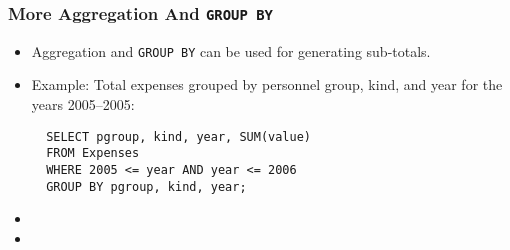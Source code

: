 \documentclass[dvipsnames]{beamer}
\begin{document}
\begin{frame}[fragile]
\frametitle{More Aggregation And \texttt{GROUP BY}}
  
\begin{itemize}

\item Aggregation and \texttt{GROUP BY} can be used for generating sub-totals.


\item Example: Total expenses grouped by personnel group, kind, and year for
  the years 2005--2005:
\begin{small}
\begin{verbatim}
  SELECT pgroup, kind, year, SUM(value) 
  FROM Expenses
  WHERE 2005 <= year AND year <= 2006 
  GROUP BY pgroup, kind, year; 
\end{verbatim}
\end{small}
    
\item {}
  
\item {} 

  \end{itemize}
\end{frame}
\end{document}
